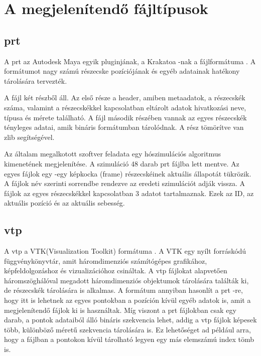 \section{A megjelenítendő fájltípusok}

\subsection{prt}

A prt az Autodesk Maya egyik pluginjának, 
a Krakatoa -nak a fájlformátuma \cite{prtsite}. 
A formátumot nagy számú részecske pozíciójának 
és egyéb adatainak hatékony tárolására tervezték.

A fájl két részből áll. 
Az első része a header, amiben metaadatok, a részecskék száma, 
valamint a részecskékkel kapcsolatban eltárolt adatok hivatkozási neve, 
típusa és mérete található. 
A fájl második részében vannak az egyes részecskék tényleges adatai, 
amik bináris formátumban tárolódnak. 
A rész tömörítve van zlib segítségével.

Az általam megalkotott szoftver feladata 
egy hószimulációs algoritmus kimenetének megjelenítése. 
A szimuláció 48 darab prt fájlba lett mentve. 
Az egyes fájlok egy -egy képkocka (frame) részecskéinek 
aktuális állapotát tükrözik. 
A fájlok név szerinti sorrendbe rendezve az eredeti szimulációt adják vissza. 
A fájlok az egyes részecskékkel kapcsolatban 3 adatot tartalmaznak. 
Ezek az ID, az aktuális pozíció és az aktuális sebesség.

\subsection{vtp}

A vtp a VTK(Visualization Toolkit) formátuma \cite{wiki:vtk}. 
A VTK egy nyílt forráskódú függvénykönyvtár, 
amit háromdimenziós számítógépes grafikához, képfeldolgozáshoz 
és vizualizációhoz csináltak. 
A vtp fájlokat alapvetően háromszöghálóval 
megadott háromdimenziós objektumok tárolására találták ki, 
de részecskék tárolására is alkalmas. 
A formátum annyiban hasonlít a prt -re, 
hogy itt is lehetnek az egyes pontokban a pozíción kívül egyéb adatok is, 
amit a megjelenítendő fájlok ki is használtak. 
Míg viszont a prt fájlokban csak egy darab, 
a pontok adataiból álló bináris szekvencia lehet, 
addig a vtp fájlok képesek több, 
különböző méretű szekvencia tárolására is. 
Ez lehetőséget ad például arra, 
hogy a fájlban a pontokon kívül tárolható legyen 
egy más elemszámú index tömb is. 

